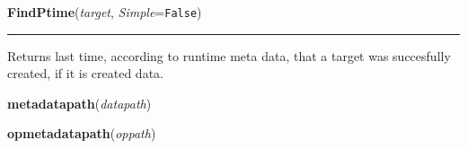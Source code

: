     \label{System:MetaData:FindPtime}

    \vspace{0.5ex}

\hspace{.8\funcindent}\begin{boxedminipage}{\funcwidth}

    \raggedright \textbf{FindPtime}(\textit{target}, \textit{Simple}={\tt False})

    \vspace{-1.5ex}

    \rule{\textwidth}{0.5\fboxrule}
\setlength{\parskip}{2ex}
    Returns last time, according to runtime meta data, that a target was 
    succesfully created, if it is created data.

\setlength{\parskip}{1ex}
    \end{boxedminipage}

    \label{System:MetaData:metadatapath}

    \vspace{0.5ex}

\hspace{.8\funcindent}\begin{boxedminipage}{\funcwidth}

    \raggedright \textbf{metadatapath}(\textit{datapath})

\setlength{\parskip}{2ex}
\setlength{\parskip}{1ex}
    \end{boxedminipage}

    \label{System:MetaData:opmetadatapath}

    \vspace{0.5ex}

\hspace{.8\funcindent}\begin{boxedminipage}{\funcwidth}

    \raggedright \textbf{opmetadatapath}(\textit{oppath})

\setlength{\parskip}{2ex}
\setlength{\parskip}{1ex}
    \end{boxedminipage}

